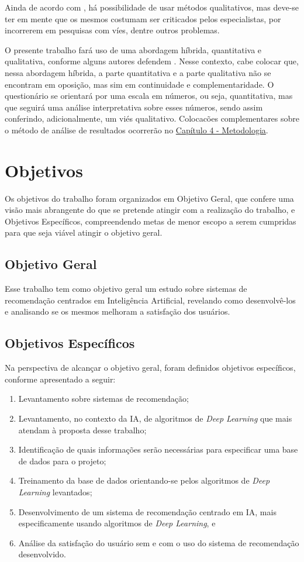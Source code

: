 Ainda de acordo com , há possibilidade de usar métodos qualitativos, mas deve-se ter em mente 
que os mesmos costumam ser criticados pelos especialistas, por incorrerem em pesquisas com víes, dentre outros problemas.

O presente trabalho fará uso de uma abordagem híbrida, quantitativa e qualitativa, conforme alguns autores defendem 
\cite{minayo1993}. Nesse contexto, cabe colocar que, nessa abordagem híbrida, a parte quantitativa e a parte qualitativa 
não se encontram em oposição, mas sim em continuidade e complementaridade. O questionário se orientará por uma escala em 
números, ou seja, quantitativa, mas que seguirá uma análise interpretativa sobre esses números, sendo assim conferindo, 
adicionalmente, um viés qualitativo. Colocacões complementares sobre o método de análise de resultados ocorrerão no 
\hyperref[chap:metodologia]{Capítulo 4 - Metodologia}.

\section{Objetivos}\label{sec:objetivos}
Os objetivos do trabalho foram organizados em Objetivo Geral, que confere uma visão mais abrangente do que se pretende 
atingir com a realização do trabalho, e Objetivos Específicos, compreendendo metas de menor escopo a serem cumpridas 
para que seja viável atingir o objetivo geral.

\subsection{Objetivo Geral}\label{subsec:objgeral}
Esse trabalho tem como objetivo geral um estudo sobre sistemas de recomendação centrados em Inteligência Artificial, 
revelando como desenvolvê-los e analisando se os mesmos melhoram a satisfação dos usuários.

\subsection{Objetivos Específicos}\label{subsec:objesp}
Na perspectiva de alcançar o objetivo geral, foram definidos objetivos específicos, conforme apresentado a seguir:

\begin{enumerate}
    \item Levantamento sobre sistemas de recomendação;
    \item Levantamento, no contexto da IA, de algoritmos de \textit{Deep Learning} que mais atendam à proposta desse trabalho;
    \item Identificação de quais informações serão necessárias para especificar uma base de dados para o projeto;
    \item Treinamento da base de dados orientando-se pelos algoritmos de \textit{Deep Learning} levantados;
    \item Desenvolvimento de um sistema de recomendação centrado em IA, mais especificamente usando algoritmos de \textit{Deep Learning}, e
    \item Análise da satisfação do usuário sem e com o uso do sistema de recomendação desenvolvido.
\end{enumerate}


